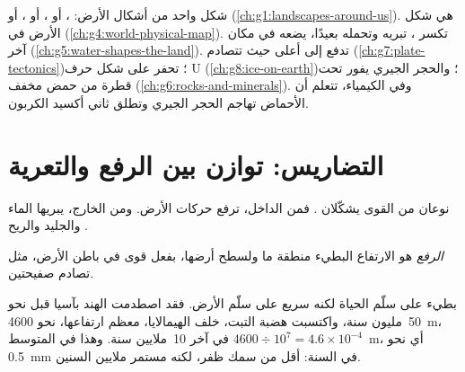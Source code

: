 \begin{recall}
\emph{} شكل واحد من أشكال الأرض: ، أو ، أو ، أو
 (\cref{ch:g1:landscapes-around-us}).  هي شكل الأرض في
 (\cref{ch:g4:world-physical-map}).  تكسر ،
 تبريه وتحمله بعيدًا،  يضعه في مكان آخر
(\cref{ch:g5:water-shapes-the-land}).  تدفع إلى أعلى 
حيث تتصادم (\cref{ch:g7:plate-tectonics})؛  تحفر 
على شكل حرف U (\cref{ch:g8:ice-on-earth})؛ والحجر الجيري يفور تحت قطرة
من حمض مخفف (\cref{ch:g6:rocks-and-minerals}). وفي الكيمياء، تتعلم أن
الأحماض تهاجم الحجر الجيري وتطلق ثاني أكسيد الكربون.
\end{recall}

\section{التضاريس: توازن بين الرفع والتعرية}

نوعان من القوى يشكّلان . فمن الداخل، ترفع حركات  الأرض.
ومن الخارج، يبريها الماء والجليد والريح
.

\begin{definition}[الرفع]\label{def:g9:landforms:uplift}
\emph{الرفع} هو الارتفاع البطيء  منطقة ما ولسطح أرضها،
بفعل قوى في باطن الأرض، مثل تصادم
صفيحتين.
\end{definition}

 بطيء على سلّم الحياة لكنه سريع على سلّم الأرض. فقد اصطدمت الهند
بآسيا قبل نحو 50~مليون سنة، واكتسبت هضبة التبت، خلف الهيمالايا، معظم
ارتفاعها، نحو \qty{4600}{m}، في آخر 10~ملايين سنة. وهذا في المتوسط
$4600 \div 10^7 = 4.6 \times 10^{-4}$~m، أي نحو \qty{0.5}{mm} في السنة:
أقل من سمك ظفر، لكنه مستمر ملايين
السنين.


